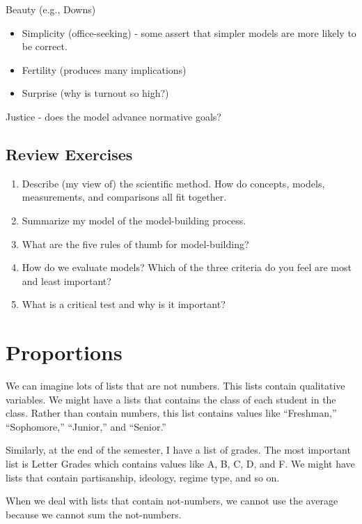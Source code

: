 \documentclass[]{book}
\providecommand{\tightlist}{%
  \setlength{\itemsep}{0pt}\setlength{\parskip}{0pt}}
\theoremstyle{definition}
\theoremstyle{definition}
\theoremstyle{definition}
\theoremstyle{remark}
\begin{document}
Beauty (e.g., Downs)

\begin{itemize}
\tightlist
\item
  Simplicity (office-seeking) - some assert that simpler models are more
  likely to be correct.
\item
  Fertility (produces many implications)
\item
  Surprise (why is turnout so high?)
\end{itemize}

Justice - does the model advance normative goals?

\section{Review Exercises}\label{review-exercises}

\begin{enumerate}
\def\labelenumi{\arabic{enumi}.}
\tightlist
\item
  Describe (my view of) the scientific method. How do concepts, models,
  measurements, and comparisons all fit together.
\item
  Summarize my model of the model-building process.
\item
  What are the five rules of thumb for model-building?
\item
  How do we evaluate models? Which of the three criteria do you feel are
  most and least important?
\item
  What is a critical test and why is it important?
\end{enumerate}

\chapter{Proportions}\label{proportions}

We can imagine lots of lists that are not numbers. This lists contain
qualitative variables. We might have a lists that contains the class of
each student in the class. Rather than contain numbers, this list
contains values like ``Freshman,'' ``Sophomore,'' ``Junior,'' and
``Senior.''

Similarly, at the end of the semester, I have a list of grades. The most
important list is Letter Grades which contains values like A, B, C, D,
and F. We might have lists that contain partisanship, ideology, regime
type, and so on.

When we deal with lists that contain not-numbers, we cannot use the
average because we cannot sum the not-numbers.
\end{document}
